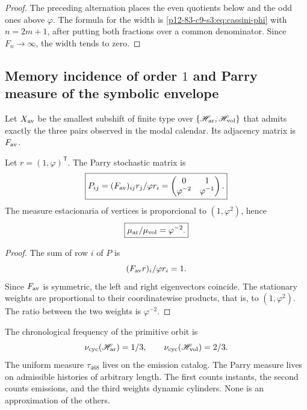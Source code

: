 \begin{proof}
The preceding alternation places the even quotients below and the odd ones
above \(\varphi\). The formula for the width is
\eqref{p12-83-c9-s3:eq:cassini-phi} with \(n=2m+1\), after putting both fractions over a
common denominator. Since \(F_n\to\infty\), the width tends to zero.
\end{proof}

\subsection{Memory incidence of order \(1\) and Parry measure of the symbolic envelope}

Let \(X_{\rm av}\) be the smallest subshift of finite type over
\(\{\mathscr H_{\rm ar},\mathscr H_{\rm vol}\}\) that admits exactly
the three pairs observed in the modal calendar. Its adjacency matrix is
\(F_{\rm av}\).

\begin{theorem}
\label{p12-83-c9-s3:thm:parry-phi}
Let \(r=(1,\varphi)^{\mathsf T}\). The Parry stochastic matrix is
\begin{equation}
 \boxed{
 P_{ij}=
 \frac{(F_{\rm av})_{ij}r_j}{\varphi r_i}
 =
 \begin{pmatrix}
 0&1\\
 \varphi^{-2}&\varphi^{-1}
 \end{pmatrix}.}
 \label{p12-83-c9-s3:eq:parry-matriz-phi}
\end{equation}
The measure estacionaria of vertices is proporcional to
\((1,\varphi^2)\), hence
\begin{equation}
 \boxed{
 \frac{\mu_{\rm ar}}{\mu_{\rm vol}}=\varphi^{-2}.}
 \label{p12-83-c9-s3:eq:parry-razon-phi}
\end{equation}
\end{theorem}

\begin{proof}
The sum of row \(i\) of \(P\) is
\[
 \frac{(F_{\rm av}r)_i}{\varphi r_i}=1.
\]
Since \(F_{\rm av}\) is symmetric, the left and right eigenvectors
coincide. The stationary weights are proportional to their coordinatewise
products, that is, to \((1,\varphi^2)\). The ratio between the
two weights is \(\varphi^{-2}\).
\end{proof}

\begin{remark}
The chronological frequency of the primitive orbit is
\[
 \nu_{\rm cyc}(\mathscr H_{\rm ar})=\frac13,
 \qquad
 \nu_{\rm cyc}(\mathscr H_{\rm vol})=\frac23.
\]
The uniform measure \(\tau_{468}\) lives on the emission catalog. The
Parry measure lives on admissible histories of arbitrary length. The
first counts instants, the second counts emissions, and the third weights
dynamic cylinders. None is an approximation of the others.
\end{remark}

